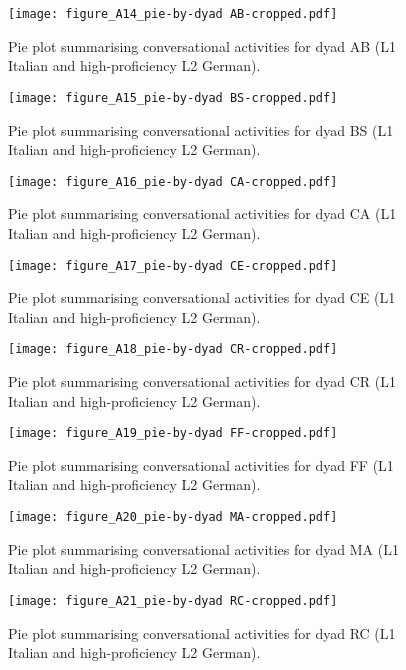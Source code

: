 \begin{figure}
\texttt{[image: figure\_A14\_pie-by-dyad AB-cropped.pdf]}
\caption{\label{fig:A14} Pie plot summarising conversational activities for dyad AB (L1 Italian and high-proficiency L2 German).}
\end{figure}

\begin{figure}
\texttt{[image: figure\_A15\_pie-by-dyad BS-cropped.pdf]}
\caption{\label{fig:A15} Pie plot summarising conversational activities for dyad BS (L1 Italian and high-proficiency L2 German).}
\end{figure}

\begin{figure}
\texttt{[image: figure\_A16\_pie-by-dyad CA-cropped.pdf]}
\caption{\label{fig:A16} Pie plot summarising conversational activities for dyad CA (L1 Italian and high-proficiency L2 German).}
\end{figure}

\begin{figure}
\texttt{[image: figure\_A17\_pie-by-dyad CE-cropped.pdf]}
\caption{\label{fig:A17} Pie plot summarising conversational activities for dyad CE (L1 Italian and high-proficiency L2 German).}
\end{figure}

\begin{figure}
\texttt{[image: figure\_A18\_pie-by-dyad CR-cropped.pdf]}
\caption{\label{fig:A18} Pie plot summarising conversational activities for dyad CR (L1 Italian and high-proficiency L2 German).}
\end{figure}

\begin{figure}
\texttt{[image: figure\_A19\_pie-by-dyad FF-cropped.pdf]}
\caption{\label{fig:A19} Pie plot summarising conversational activities for dyad FF (L1 Italian and high-proficiency L2 German).}
\end{figure}

\begin{figure}
\texttt{[image: figure\_A20\_pie-by-dyad MA-cropped.pdf]}
\caption{\label{fig:A20} Pie plot summarising conversational activities for dyad MA (L1 Italian and high-proficiency L2 German). }
\end{figure}

\begin{figure}
\texttt{[image: figure\_A21\_pie-by-dyad RC-cropped.pdf]}
\caption{\label{fig:A21} Pie plot summarising conversational activities for dyad RC (L1 Italian and high-proficiency L2 German). }
\end{figure}

